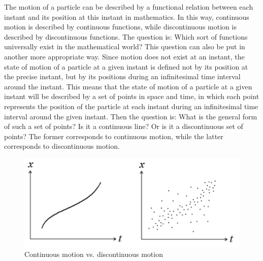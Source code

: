 The motion of a particle can be described by a functional relation between each instant and its position at this instant in mathematics. In this way, continuous motion is described by continuous functions, while discontinuous motion is described by discontinuous functions. 
The question is: Which sort of functions universally exist in the mathematical world? 
This question can also be put in another more appropriate way. 
Since motion does not exist at an instant, the state of motion of a particle at a given instant is defined not by its position at the precise instant, but by its positions during an infinitesimal time interval around the instant.
This means that the state of motion of a particle at a given instant will be described by a set of points in space and time, in which each point represents the position of the particle at each instant during an infinitesimal time interval around the given instant.
Then the question is: What is the general form of such a set of points? 
Is it a continuous line? Or is it a discontinuous set of points? The former corresponds to continuous motion, while the latter corresponds to discontinuous motion.

\begin{center} 
\begin{figure}[h]\label{cmdm}

\includegraphics[scale=0.50]{fig73.jpg}


\caption{Continuous motion vs. discontinuous motion}

\end{figure}

 \end{center} 

